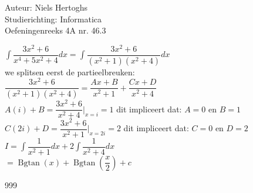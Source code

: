 \documentclass[a4paper]{article}
\begin{document}
  
\noindent \large Auteur: Niels Hertoghs \\
\noindent \large Studierichting: Informatica\\
\noindent \large Oefeningenreeks 4A nr. 46.3\

\medskip

\normalsize

$\displaystyle\int \dfrac{3x^2+6}{x^4+5x^2+4} dx = \displaystyle\int \dfrac{3x^2+6}{(x^2+1)(x^2+4)} dx$\\

we splitsen eerst de partieelbreuken:\\

$\dfrac{3x^2+6}{(x^2+1)(x^2+4)} = \dfrac{Ax+B}{x^2+1} + \dfrac{Cx+D}{x^2+4} $\\

$A(i) + B = \dfrac{3x^2+6}{x^2+4}  \bigg|_{x = i} = 1 $ dit impliceert dat: $A = 0$ en $B =1$ \\

$C(2i) + D =  \dfrac{3x^2+6}{x^2+1} \bigg|_{x = 2i} = 2 $  dit impliceert dat: $C=0$ en $D =2$\\

$I = \displaystyle\int \dfrac{1}{x^2+1}dx + 2\displaystyle\int \dfrac{1}{x^2+4}dx$\\

$= \operatorname{Bgtan}(x) + \operatorname{Bgtan}\left(\dfrac{x}{2}\right) + c $\\


\begin{thebibliography}{999}
\end{thebibliography}
\end{document}
